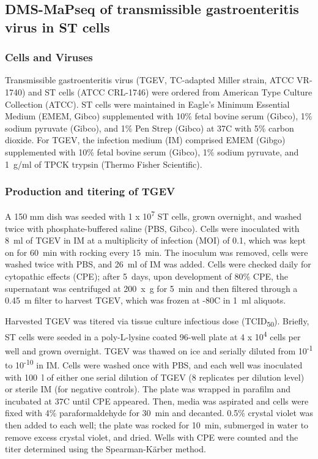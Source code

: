 \documentclass[main.tex]{subfiles}
\begin{document}
\subsection{DMS-MaPseq of transmissible gastroenteritis virus in ST cells}

\subsubsection{Cells and Viruses}

Transmissible gastroenteritis virus (TGEV, TC-adapted Miller strain, ATCC VR-1740) and ST cells (ATCC CRL-1746) were ordered from American Type Culture Collection (ATCC).
ST cells were maintained in Eagle's Minimum Essential Medium (EMEM, Gibco) supplemented with 10\% fetal bovine serum (Gibco), 1\% sodium pyruvate (Gibco), and 1\% Pen Strep (Gibco) at 37\textdegree C with 5\% carbon dioxide.
For TGEV, the infection medium (IM) comprised EMEM (Gibgo) supplemented with 10\% fetal bovine serum (Gibco), 1\% sodium pyruvate, and 1~\textmu g/ml of TPCK trypsin (Thermo Fisher Scientific).

\subsubsection{Production and titering of TGEV}

A 150 mm dish was seeded with 1 x 10\textsuperscript{7} ST cells, grown overnight, and washed twice with phosphate-buffered saline (PBS, Gibco).
Cells were inoculated with 8~ml of TGEV in IM at a multiplicity of infection (MOI) of 0.1, which was kept on for 60~min with rocking every 15~min.
The inoculum was removed, cells were washed twice with PBS, and 26~ml of IM was added.
Cells were checked daily for cytopathic effects (CPE); after 5~days, upon development of 80\% CPE, the supernatant was centrifuged at 200~x~g for 5~min and then filtered through a 0.45~\textmu m filter to harvest TGEV, which was frozen at -80\textdegree C in 1~ml aliquots.

Harvested TGEV was titered via tissue culture infectious dose (TCID\textsubscript{50}).
Briefly, ST cells were seeded in a poly-L-lysine coated 96-well plate at 4 x 10\textsuperscript{4} cells per well and grown overnight.
TGEV was thawed on ice and serially diluted from 10\textsuperscript{-1} to 10\textsuperscript{-10} in IM.
Cells were washed once with PBS, and each well was inoculated with 100~\textmu l of either one serial dilution of TGEV (8 replicates per dilution level) or sterile IM (for negative controls).
The plate was wrapped in parafilm and incubated at 37\textdegree C until CPE appeared.
Then, media was aspirated and cells were fixed with 4\% paraformaldehyde for 30~min and decanted.
0.5\% crystal violet was then added to each well; the plate was rocked for 10~min, submerged in water to remove excess crystal violet, and dried.
Wells with CPE were counted and the titer determined using the Spearman-Kärber method.
\end{document}
